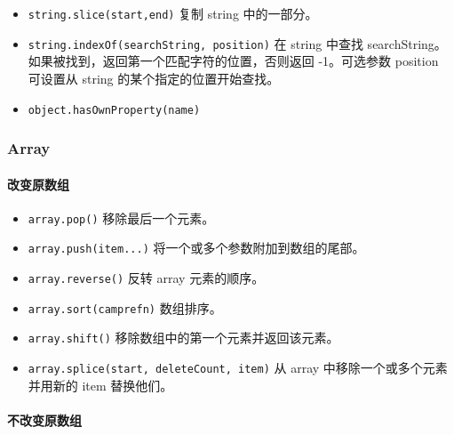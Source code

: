 \begin{itemize}
\tightlist
\item
  \lstinline!string.slice(start,end)! 复制 string 中的一部分。
\item
  \lstinline!string.indexOf(searchString, position)! 在 string 中查找
  searchString。如果被找到，返回第一个匹配字符的位置，否则返回
  -1。可选参数 position 可设置从 string 的某个指定的位置开始查找。
\item
  \lstinline!object.hasOwnProperty(name)!
\end{itemize}

\subsubsection{Array}\label{array}

\paragraph{改变原数组}\label{ux6539ux53d8ux539fux6570ux7ec4}

\begin{itemize}
\tightlist
\item
  \lstinline!array.pop()! 移除最后一个元素。
\item
  \lstinline!array.push(item...)! 将一个或多个参数附加到数组的尾部。
\item
  \lstinline!array.reverse()! 反转 array 元素的顺序。
\item
  \lstinline!array.sort(camprefn)! 数组排序。
\item
  \lstinline!array.shift()! 移除数组中的第一个元素并返回该元素。
\item
  \lstinline!array.splice(start, deleteCount, item)! 从 array
  中移除一个或多个元素并用新的 item 替换他们。
\end{itemize}

\paragraph{不改变原数组}\label{ux4e0dux6539ux53d8ux539fux6570ux7ec4}


